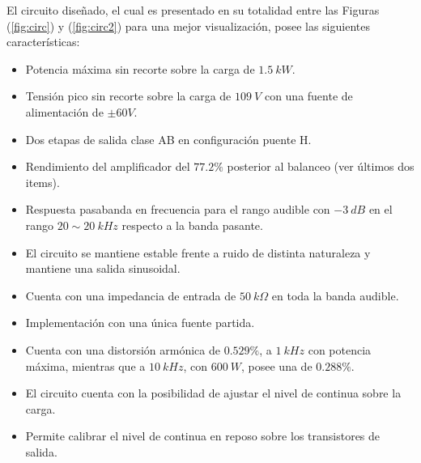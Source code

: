 
El circuito diseñado, el cual es presentado en su totalidad entre las Figuras (\ref{fig:circ}) y (\ref{fig:circ2}) para una mejor visualización, posee las siguientes características:
\begin{itemize}
\item Potencia máxima sin recorte sobre la carga de $1.5 \ kW$.
\item Tensión pico sin recorte sobre la carga de $109 \ V$ con una fuente de alimentación de $\pm 60V$.
\item Dos etapas de salida clase AB en configuración puente H.
\item Rendimiento del amplificador del $77.2\%$ posterior al balanceo (ver últimos dos items).
\item Respuesta pasabanda en frecuencia para el rango audible con $-3 \ dB$ en el rango $20 \sim 20 \ kHz$ respecto a la banda pasante.
\item El circuito se mantiene estable frente a ruido de distinta naturaleza y mantiene una salida sinusoidal.
\item Cuenta con una impedancia de entrada de $50 \ k\Omega$ en toda la banda audible.
\item Implementación con una única fuente partida.
\item Cuenta con una distorsión armónica de $0.529 \%$, a $1 \ kHz$ con potencia máxima, mientras que a $10 \ kHz$, con $600 \ W$, posee una de $0.288\%$.
\item El circuito cuenta con la posibilidad de ajustar el nivel de continua sobre la carga.
\item Permite calibrar el nivel de continua en reposo sobre los transistores de salida.
\end{itemize}

